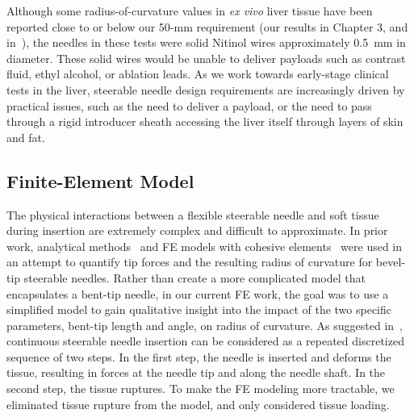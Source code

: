 Although some radius-of-curvature values in \textit{ex vivo} liver tissue have been reported close to or below our 50-mm requirement (our results in Chapter 3, and in~\cite{Majewicz2010}), the needles in these tests were solid Nitinol wires approximately 0.5~mm in diameter. These solid wires would be unable to deliver payloads such as contrast fluid, ethyl alcohol, or ablation leads. As we work towards early-stage clinical tests in the liver, steerable needle design requirements are increasingly driven by practical issues, such as the need to deliver a payload, or the need to pass through a rigid introducer sheath accessing the liver itself through layers of skin and fat.

\subsection{Finite-Element Model}
The physical interactions between a flexible steerable needle and soft tissue during insertion are extremely complex and difficult to approximate. In prior work, analytical methods~\cite{Misra2010} and FE models with cohesive elements~\cite{Misra2008} were used in an attempt to quantify tip forces and the resulting radius of curvature for bevel-tip steerable needles. Rather than create a more complicated model that encapsulates a bent-tip needle, in our current FE work, the goal was to use a simplified model to gain qualitative insight into the impact of the two specific parameters, bent-tip length and angle, on radius of curvature. As suggested in~\cite{Misra2010,Mahvash2001,Barbe2007}, continuous steerable needle insertion can be considered as a repeated discretized sequence of two steps. In the first step, the needle is inserted and deforms the tissue, resulting in forces at the needle tip and along the needle shaft. In the second step, the tissue ruptures. To make the FE modeling more tractable, we eliminated tissue rupture from the model, and only considered tissue loading. 

